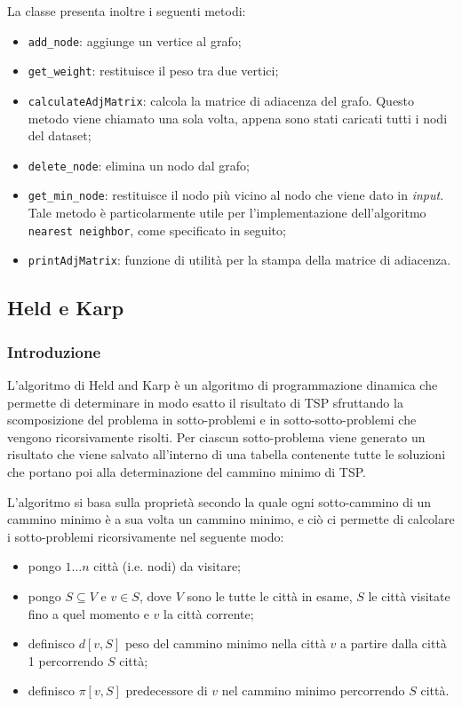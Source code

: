 La classe presenta inoltre i seguenti metodi:
\begin{itemize}
    \item \texttt{add\_node}: aggiunge un vertice al grafo;
    \item \texttt{get\_weight}: restituisce il peso tra due vertici;
    \item \texttt{calculateAdjMatrix}: calcola la matrice di adiacenza del grafo. Questo metodo viene chiamato una sola volta, appena sono stati caricati tutti i nodi del dataset;
    \item \texttt{delete\_node}: elimina un nodo dal grafo;
    \item \texttt{get\_min\_node}: restituisce il nodo più vicino al nodo che viene dato in \textit{input}. Tale metodo è particolarmente utile per l'implementazione dell'algoritmo \texttt{nearest neighbor}, come specificato in seguito;
    \item \texttt{printAdjMatrix}: funzione di utilità per la stampa della matrice di adiacenza. 
\end{itemize}

\subsection{Held e Karp}

\subsubsection{Introduzione}

L'algoritmo di Held and Karp è un algoritmo di programmazione dinamica che permette di determinare in modo esatto il risultato di TSP sfruttando la scomposizione del problema in sotto-problemi e in sotto-sotto-problemi che vengono ricorsivamente risolti. Per ciascun sotto-problema viene generato un risultato che viene salvato all'interno di una tabella contenente tutte le soluzioni che portano poi alla determinazione del cammino minimo di TSP.

L'algoritmo si basa sulla proprietà secondo la quale ogni sotto-cammino di un cammino minimo è a sua volta un cammino minimo, e ciò ci permette di calcolare i sotto-problemi ricorsivamente nel seguente modo: 

\begin{itemize}
    \item  pongo \(1 \dots n\) città (i.e. nodi) da visitare;
    \item  pongo \(S \subseteq V\) e \(v \in S\), dove \(V\) sono le tutte le città in esame, \(S\) le città visitate fino a quel momento e \(v\) la città corrente;

\item definisco \(d[v, S]\) peso del cammino minimo nella città \(v\) a partire dalla città 1 percorrendo \(S\) città;
\item definisco \(\pi[v, S]\) predecessore di \(v\) nel cammino minimo percorrendo \(S\) città.
\end{itemize}

